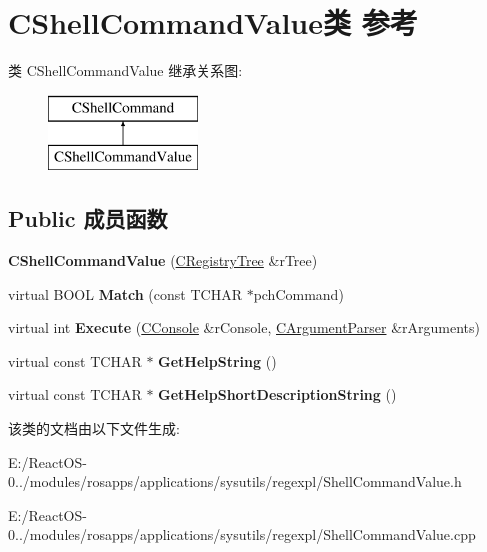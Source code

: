 \hypertarget{class_c_shell_command_value}{}\section{C\+Shell\+Command\+Value类 参考}
\label{class_c_shell_command_value}
类 C\+Shell\+Command\+Value 继承关系图\+:\begin{figure}[H]
\begin{center}
\leavevmode
\includegraphics[height=2.000000cm]{class_c_shell_command_value}
\end{center}
\end{figure}
\subsection*{Public 成员函数}
\begin{DoxyCompactItemize}
\item 
\mbox{\label{class_c_shell_command_value_acda153b69cbffa9a3ad5ed9a5b5f4f13}} 
{\bfseries C\+Shell\+Command\+Value} (\hyperlink{class_c_registry_tree}{C\+Registry\+Tree} \&r\+Tree)
\item 
\mbox{\label{class_c_shell_command_value_ae07f9a9c23a0b773799578afcae172b8}} 
virtual B\+O\+OL {\bfseries Match} (const T\+C\+H\+AR $\ast$pch\+Command)
\item 
\mbox{\label{class_c_shell_command_value_a9cf68222691f1886f9932c470baa7e03}} 
virtual int {\bfseries Execute} (\hyperlink{class_c_console}{C\+Console} \&r\+Console, \hyperlink{class_c_argument_parser}{C\+Argument\+Parser} \&r\+Arguments)
\item 
\mbox{\label{class_c_shell_command_value_a56976d34b11d32b8ad4a6b0f179c43cf}} 
virtual const T\+C\+H\+AR $\ast$ {\bfseries Get\+Help\+String} ()
\item 
\mbox{\label{class_c_shell_command_value_a76ba1eba31a82b30489dd65d6bd3de12}} 
virtual const T\+C\+H\+AR $\ast$ {\bfseries Get\+Help\+Short\+Description\+String} ()
\end{DoxyCompactItemize}


该类的文档由以下文件生成\+:\begin{DoxyCompactItemize}
\item 
E\+:/\+React\+O\+S-\/0../modules/rosapps/applications/sysutils/regexpl/Shell\+Command\+Value.\+h\item 
E\+:/\+React\+O\+S-\/0../modules/rosapps/applications/sysutils/regexpl/Shell\+Command\+Value.\+cpp\end{DoxyCompactItemize}
